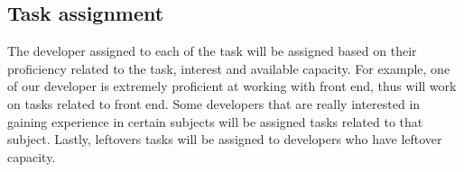 \documentclass{article}
\begin{document}
\subsection{Task assignment}
The developer assigned to each of the task will be assigned based on their proficiency related to the task, interest and available capacity. For example, one of our developer is extremely proficient at working with front end, thus will work on tasks related to front end. Some developers that are really interested in gaining experience in certain subjects will be assigned tasks related to that subject. Lastly, leftovers tasks will be assigned to developers who have leftover capacity.
\end{document}
